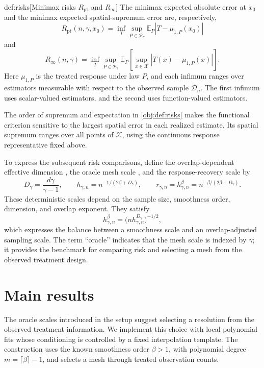 \documentclass[11pt]{article}
\begin{document}
\begin{definitionv}{def:risks}[Minimax risks $R_{\mathrm{pt}}$ and $R_\infty$]
The minimax expected absolute error at \(x_0\) and the minimax expected spatial-supremum error are, respectively,
\[
R_{\mathrm{pt}}(n,\gamma,x_0)
=
\inf_T\sup_{P\in\mathcal P_\gamma}
\mathbb E_P\left|T-\mu_{1,P}(x_0)\right|
\]
and
\[
R_\infty(n,\gamma)
=
\inf_T\sup_{P\in\mathcal P_\gamma}
\mathbb E_P\left[
\sup_{x\in\mathcal X}\left|T(x)-\mu_{1,P}(x)\right|
\right].
\]
Here \(\mu_{1,P}\) is the treated response under law \(P\), and each infimum ranges over estimators measurable with respect to the observed sample \(\mathcal D_n\). The first infimum uses scalar-valued estimators, and the second uses function-valued estimators.
\end{definitionv}

The order of supremum and expectation in \cref{obj:def:risks} makes the functional criterion sensitive to the largest spatial error in each realized estimate. Its spatial supremum ranges over all points of \(\mathcal X\), using the continuous response representative fixed above.

To express the subsequent risk comparisons, define the overlap-dependent effective dimension , the oracle mesh scale , and the response-recovery scale  by
\[
D_\gamma=\frac{d\gamma}{\gamma-1},
\qquad
h_{\gamma,n}=n^{-1/(2\beta+D_\gamma)},
\qquad
r_{\gamma,n}=h_{\gamma,n}^{\beta}
=n^{-\beta/(2\beta+D_\gamma)}.
\]
These deterministic scales depend on the sample size, smoothness order, dimension, and overlap exponent. They satisfy
\[
h_{\gamma,n}^{\beta}
=
\bigl(nh_{\gamma,n}^{D_\gamma}\bigr)^{-1/2},
\]
which expresses the balance between a smoothness scale and an overlap-adjusted sampling scale. The term ``oracle'' indicates that the mesh scale is indexed by \(\gamma\); it provides the benchmark for comparing risk and selecting a mesh from the observed treatment design.


\section{Main results}

The oracle scales introduced in the setup suggest selecting a resolution from the observed treatment information. We implement this choice with local polynomial fits whose conditioning is controlled by a fixed interpolation template. The construction uses the known smoothness order \(\beta>1\), with polynomial degree \(m=\lceil\beta\rceil-1\), and selects a mesh through treated observation counts.
\end{document}
